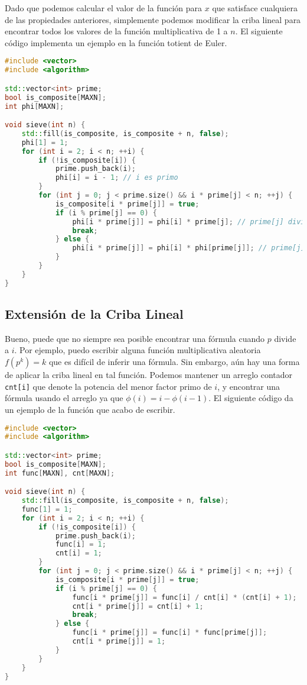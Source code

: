 \documentclass[11pt]{scrartcl}
\begin{document}
Dado que podemos calcular el valor de la función para \(x\) que satisface cualquiera de las propiedades anteriores, simplemente podemos modificar la criba lineal para encontrar todos los valores de la función multiplicativa de 1 a \(n\). El siguiente código implementa un ejemplo en la función totient de Euler.

\begin{lstlisting}[language=C++,caption=Criba Lineal para la Función Totient de Euler]
#include <vector>
#include <algorithm>

std::vector<int> prime;
bool is_composite[MAXN];
int phi[MAXN];

void sieve(int n) {
    std::fill(is_composite, is_composite + n, false);
    phi[1] = 1;
    for (int i = 2; i < n; ++i) {
        if (!is_composite[i]) {
            prime.push_back(i);
            phi[i] = i - 1; // i es primo
        }
        for (int j = 0; j < prime.size() && i * prime[j] < n; ++j) {
            is_composite[i * prime[j]] = true;
            if (i % prime[j] == 0) {
                phi[i * prime[j]] = phi[i] * prime[j]; // prime[j] divide i
                break;
            } else {
                phi[i * prime[j]] = phi[i] * phi[prime[j]]; // prime[j] no divide i
            }
        }
    }
}
\end{lstlisting}

\subsection*{Extensión de la Criba Lineal}

Bueno, puede que no siempre sea posible encontrar una fórmula cuando \(p\) divide a \(i\). Por ejemplo, puedo escribir alguna función multiplicativa aleatoria \(f(p^k) = k\) que es difícil de inferir una fórmula. Sin embargo, aún hay una forma de aplicar la criba lineal en tal función. Podemos mantener un arreglo contador \texttt{cnt[i]} que denote la potencia del menor factor primo de \(i\), y encontrar una fórmula usando el arreglo ya que \(\phi(i) = i - \phi(i - 1)\). El siguiente código da un ejemplo de la función que acabo de escribir.

\begin{lstlisting}[language=C++,caption=Criba Lineal para una Función Multiplicativa Aleatoria]
#include <vector>
#include <algorithm>

std::vector<int> prime;
bool is_composite[MAXN];
int func[MAXN], cnt[MAXN];

void sieve(int n) {
    std::fill(is_composite, is_composite + n, false);
    func[1] = 1;
    for (int i = 2; i < n; ++i) {
        if (!is_composite[i]) {
            prime.push_back(i);
            func[i] = 1;
            cnt[i] = 1;
        }
        for (int j = 0; j < prime.size() && i * prime[j] < n; ++j) {
            is_composite[i * prime[j]] = true;
            if (i % prime[j] == 0) {
                func[i * prime[j]] = func[i] / cnt[i] * (cnt[i] + 1);
                cnt[i * prime[j]] = cnt[i] + 1;
                break;
            } else {
                func[i * prime[j]] = func[i] * func[prime[j]];
                cnt[i * prime[j]] = 1;
            }
        }
    }
}
\end{lstlisting}
\end{document}
